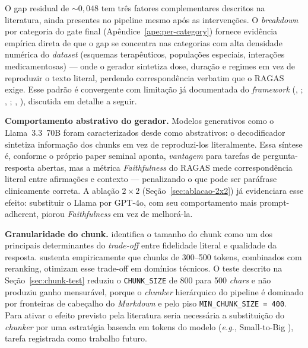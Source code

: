 \documentclass[
  12pt,
  oneside,
  a4paper,
  english,
  brazil
]{abntex2}
\begin{document}
O gap residual de $\sim 0{,}048$ tem três fatores complementares descritos na
literatura, ainda presentes no pipeline mesmo após as intervenções. O
\emph{breakdown} por categoria do gate final
(Apêndice~\ref{ape:per-category}) fornece evidência empírica direta de
que o gap se concentra nas categorias com alta densidade numérica do
\textit{dataset} (esquemas terapêuticos, populações especiais,
interações medicamentosas) --- onde o gerador sintetiza dose, duração e
regimes em vez de reproduzir o texto literal, perdendo correspondência
verbatim que o RAGAS exige. Esse padrão é convergente com limitação já
documentada do \emph{framework} (\citeauthor{es2024},
\citeyear{es2024}; \citeauthor{huang2023halucination},
\citeyear{huang2023halucination}; \citeauthor{ocaf2024},
\citeyear{ocaf2024}), discutida em detalhe a seguir.

\textbf{Comportamento abstrativo do gerador.} Modelos generativos como o
Llama~3.3~70B foram caracterizados desde \citeauthor{lewis2021}
\cite{lewis2021} como abstrativos: o decodificador sintetiza informação dos
chunks em vez de reproduzi-los literalmente. Essa síntese é, conforme
o próprio paper seminal aponta, \textit{vantagem} para tarefas de
pergunta-resposta abertas, mas a métrica \textit{Faithfulness} do RAGAS
\cite{es2024} mede correspondência literal entre afirmações e contexto ---
penalizando o que pode ser paráfrase clinicamente correta. A ablação $2 \times 2$
(Seção~\ref{sec:ablacao-2x2}) já evidenciara esse efeito: substituir o Llama
por GPT-4o, com seu comportamento mais prompt-adherent, piorou
\textit{Faithfulness} em vez de melhorá-la.

\textbf{Granularidade do chunk.} \citeauthor{gao2024} \cite{gao2024}
identifica o tamanho do chunk como um dos principais determinantes
do \textit{trade-off} entre fidelidade literal e qualidade da resposta.
\citeauthor{wang2024bestpractices} \cite{wang2024bestpractices} sustenta
empiricamente que chunks de 300--500 tokens, combinados com
reranking, otimizam esse trade-off em domínios técnicos. O teste
descrito na Seção~\ref{sec:chunk-test} reduziu o \texttt{CHUNK\_SIZE} de 800
para 500 \textit{chars} e não produziu ganho mensurável, porque o
\textit{chunker} hierárquico do pipeline é dominado por fronteiras
de cabeçalho do \textit{Markdown} e pelo piso \texttt{MIN\_CHUNK\_SIZE = 400}.
Para ativar o efeito previsto pela literatura seria necessária a substituição
do \textit{chunker} por uma estratégia baseada em tokens do modelo
(\textit{e.g.}, Small-to-Big \cite{advancedChunkingRAG2025}), tarefa
registrada como trabalho futuro.
\end{document}
